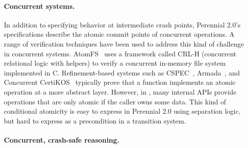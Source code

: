 
\paragraph{Concurrent systems.}

In addition to specifying behavior at intermediate crash points, Perennial 2.0's
specifications describe the atomic commit points of concurrent operations. A
range of verification techniques have been used to address this kind of
challenge in concurrent systems. AtomFS~\cite{zou:atomfs} uses a framework
called CRL-H (concurrent relational logic with helpers) to verify a concurrent
in-memory file system implemented in C. Refinement-based systems such as
CSPEC~\cite{chajed:cspec}, Armada~\cite{lorch:armada}, and Concurrent
CertiKOS~\cite{gu:certikos-ccal} typically prove that a function implements an
atomic operation at a more abstract layer.
However, in \txn, many internal APIs provide operations that are only atomic if
the caller owns some data. This kind of conditional atomicity is easy to express
in Perennial 2.0 using separation logic, but hard to express
as a precondition in a transition system.



\paragraph{Concurrent, crash-safe reasoning.}

